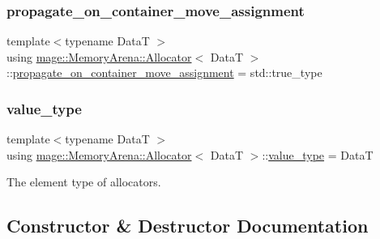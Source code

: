 \subsubsection{\texorpdfstring{propagate\+\_\+on\+\_\+container\+\_\+move\+\_\+assignment}{propagate\_on\_container\_move\_assignment}}
{\footnotesize\ttfamily template$<$typename DataT $>$ \\
using \mbox{\hyperlink{classmage_1_1_memory_arena_1_1_allocator}{mage\+::\+Memory\+Arena\+::\+Allocator}}$<$ DataT $>$\+::\mbox{\hyperlink{classmage_1_1_memory_arena_1_1_allocator_adeee02145ab4a2eca5e38a70babd81e0}{propagate\+\_\+on\+\_\+container\+\_\+move\+\_\+assignment}} =  std\+::true\+\_\+type}

\mbox{\label{classmage_1_1_memory_arena_1_1_allocator_a6ae3ef840bd738889b2c4136294a4f6d}} 
\subsubsection{\texorpdfstring{value\+\_\+type}{value\_type}}
{\footnotesize\ttfamily template$<$typename DataT $>$ \\
using \mbox{\hyperlink{classmage_1_1_memory_arena_1_1_allocator}{mage\+::\+Memory\+Arena\+::\+Allocator}}$<$ DataT $>$\+::\mbox{\hyperlink{classmage_1_1_memory_arena_1_1_allocator_a6ae3ef840bd738889b2c4136294a4f6d}{value\+\_\+type}} =  DataT}

The element type of allocators. 

\subsection{Constructor \& Destructor Documentation}
\mbox{\label{classmage_1_1_memory_arena_1_1_allocator_ac7d640d69207604612c29ebc60ec6648}} 
